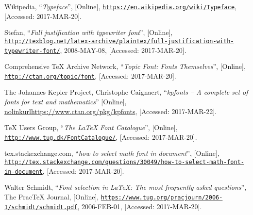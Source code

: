 \documentclass[a4paper,oneside,11pt]{article}
\begin{document}
\newpage
\begin{thebibliography}{1}

        Wikipedia,
        ``\emph{Typeface}'',
        [Online],
        \href{https://en.wikipedia.org/wiki/Typeface}
             {\nolinkurl{https://en.wikipedia.org/wiki/Typeface}},
        [Accessed: 2017-MAR-20].

        Stefan,
        ``\emph{Full justification with typewriter font}'',
        [Online],
        \href{http://texblog.net/latex-archive/plaintex/full-justification-with-typewriter-font/}
             {\nolinkurl{http://texblog.net/latex-archive/plaintex/full-justification-with-typewriter-font/}},
        2008-MAY-08,
        [Accessed: 2017-MAR-20].

        Comprehensive \TeX{} Archive Network,
        ``\emph{Topic Font: Fonts Themselves}'',
        [Online],
        \href{http://ctan.org/topic/font}
             {\nolinkurl{http://ctan.org/topic/font}},
        [Accessed: 2017-MAR-20].

        The Johannes Kepler Project, Christophe Caignaert,
        ``\emph{kpfonts -- A complete set of fonts for text and mathematics}''
        [Online],
        \href{https://www.ctan.org/pkg/kpfonts}
             {nolinkurl{https://www.ctan.org/pkg/kpfonts}},
        [Accessed: 2017-MAR-22].

        \TeX{} Users Group,
        ``\emph{The \LaTeX{} Font Catalogue}'',
        [Online],
        \href{http://www.tug.dk/FontCatalogue/}
             {\nolinkurl{http://www.tug.dk/FontCatalogue/}},
        [Accessed: 2017-MAR-20].

        tex.stackexchange.com,
        ``\emph{how to select math font in document}'',
        [Online],
        \href{http://tex.stackexchange.com/questions/30049/how-to-select-math-font-in-document}
             {\nolinkurl{http://tex.stackexchange.com/questions/30049/how-to-select-math-font-in-document}},
        [Accessed: 2017-MAR-20].

        Walter Schmidt,
        ``\emph{Font selection in \LaTeX{}: The most frequently asked questions}'',
        The Prac\TeX{} Journal,
        [Online],
        \href{https://www.tug.org/pracjourn/2006-1/schmidt/schmidt.pdf}
             {\nolinkurl{https://www.tug.org/pracjourn/2006-1/schmidt/schmidt.pdf}},
        2006-FEB-01,
        [Accessed: 2017-MAR-20].


\end{thebibliography}
\end{document}
